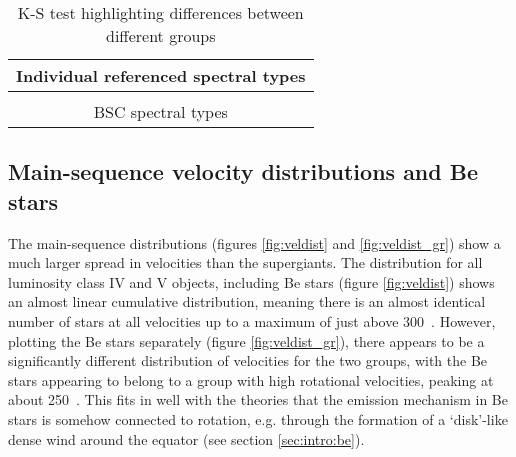 \begin{table} %
\begin{center}
\caption{K-S test highlighting differences between different groups}
\label{ta:ks:inter}
\vspace{\abovecaptionskip}
\begin{tabular}{l|cccc}
\multicolumn{5}{c}{Individual referenced spectral types}\\
\hline\hline

\hline\hline
\multicolumn{5}{c}{}\\
\multicolumn{5}{c}{BSC spectral types}\\
\hline\hline

\hline\hline
\end{tabular}
\end{center}
\end{table} %


\subsection{Main-sequence velocity distributions and Be stars}
\label{sec:ms_vdist}

The main-sequence distributions (figures \ref{fig:veldist} and
\ref{fig:veldist_gr}) show a much larger spread in velocities than
the supergiants.
The distribution for all luminosity class IV and V objects, including
Be stars (figure \ref{fig:veldist}) shows an almost linear cumulative
distribution, meaning there is an almost identical number of stars at
all velocities up to a maximum of just above 300~\kms. However,
plotting the Be stars separately (figure \ref{fig:veldist_gr}), there
appears to be a significantly different distribution of velocities for
the two groups, with the Be stars appearing to belong to a group with
high rotational velocities, peaking at about 250~\kms. This fits in
well with the theories that the emission mechanism in Be stars is
somehow connected to rotation, e.g. through the formation of a
`disk'-like dense wind around the equator (see section \ref{sec:intro:be}).

